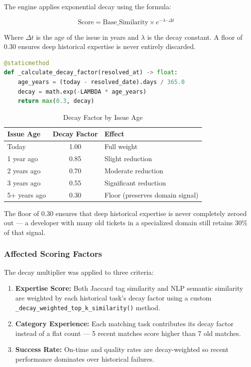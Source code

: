 \documentclass[12pt, a4paper]{article}
\begin{document}
The engine applies exponential decay using the formula:

\[
\text{Score} = \text{Base\_Similarity} \times e^{-\lambda \cdot \Delta t}
\]

Where $\Delta t$ is the age of the issue in years and $\lambda$ is the decay constant. A floor of 0.30 ensures deep historical expertise is never entirely discarded.

\begin{lstlisting}[language=Python, caption={Time-decay formula — scoring\_engine.py}]
@staticmethod
def _calculate_decay_factor(resolved_at) -> float:
    age_years = (today - resolved_date).days / 365.0
    decay = math.exp(-LAMBDA * age_years)
    return max(0.3, decay)
\end{lstlisting}

\begin{table}[H]
\centering
\caption{Decay Factor by Issue Age}
\begin{tabular}{|l|c|l|}
\hline
\textbf{Issue Age} & \textbf{Decay Factor} & \textbf{Effect} \\
\hline
Today         & 1.00 & Full weight \\
1 year ago    & 0.85 & Slight reduction \\
2 years ago   & 0.70 & Moderate reduction \\
3 years ago   & 0.55 & Significant reduction \\
5+ years ago  & 0.30 & Floor (preserves domain signal) \\
\hline
\end{tabular}
\end{table}

The floor of 0.30 ensures that deep historical expertise is never completely zeroed out — a developer with many old tickets in a specialized domain still retains 30\% of that signal.

\subsubsection{Affected Scoring Factors}

The decay multiplier was applied to three criteria:

\begin{enumerate}
    \item \textbf{Expertise Score:} Both Jaccard tag similarity and NLP semantic similarity are weighted by each historical task's decay factor using a custom \texttt{\_decay\_weighted\_top\_k\_similarity()} method.
    \item \textbf{Category Experience:} Each matching task contributes its decay factor instead of a flat count — 5 recent matches score higher than 7 old matches.
    \item \textbf{Success Rate:} On-time and quality rates are decay-weighted so recent performance dominates over historical failures.
\end{enumerate}
\end{document}
